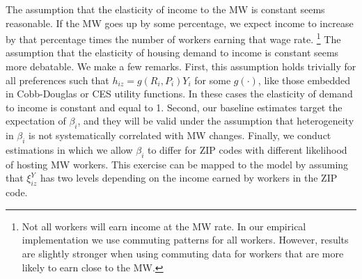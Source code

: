 The assumption that the elasticity of income to the MW is constant seems 
reasonable.
If the MW goes up by some percentage, we expect income to increase by that
percentage times the number of workers earning that wage rate.%
\footnote{Not all workers will earn income at the MW rate. In our empirical
implementation we use commuting patterns for all workers.
However, results are slightly stronger when using commuting data for workers that 
are more likely to earn close to the MW.}
The assumption that the elasticity of housing demand to income is constant 
seems more debatable.
We make a few remarks.
First, this assumption holds trivially for all preferences such that 
$h_{iz} = g\left(R_i, P_i\right) Y_i$ for some $g\left(\cdot\right)$, 
like those embedded in Cobb-Douglas or CES utility functions.
In these cases the elasticity of demand to income is constant and equal to 1. 
Second, our baseline estimates target the expectation of $\beta_i$, and they 
will be valid under the assumption that heterogeneity in $\beta_i$ is not 
systematically correlated with MW changes.
Finally, we conduct estimations in which we allow $\beta_i$ to differ for 
ZIP codes with different likelihood of hosting MW workers.
This exercise can be mapped to the model by assuming that $\xi^Y_{iz}$ has two
levels depending on the income earned by workers in the ZIP code.

